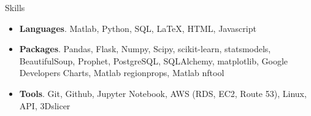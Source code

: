 \documentclass{resume} %
\begin{document}
	
	
	
	
	\begin{rSection}{Skills}
		\begin{itemize}[leftmargin=0em]
			\item {\bf Languages}{. Matlab, Python, SQL, LaTeX, HTML, Javascript}
			\item {\bf Packages}{. Pandas, Flask, Numpy, Scipy, scikit-learn, statsmodels, BeautifulSoup, Prophet, PostgreSQL, SQLAlchemy, matplotlib, Google Developers Charts, Matlab regionprops, Matlab nftool}
			\item {\bf Tools}{. Git, Github, Jupyter Notebook, AWS (RDS, EC2, Route 53), Linux, API, 3Dslicer}
			
		\end{itemize}
	\end{rSection}
\end{document}
